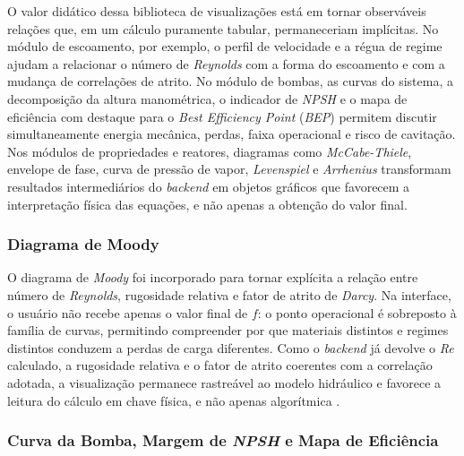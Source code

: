 O valor didático dessa biblioteca de visualizações está em tornar observáveis relações que, em um cálculo puramente tabular, permaneceriam implícitas. No módulo de escoamento, por exemplo, o perfil de velocidade e a régua de regime ajudam a relacionar o número de \textit{Reynolds} com a forma do escoamento e com a mudança de correlações de atrito. No módulo de bombas, as curvas do sistema, a decomposição da altura manométrica, o indicador de \textit{NPSH} e o mapa de eficiência com destaque para o \textit{Best Efficiency Point} (\textit{BEP}) permitem discutir simultaneamente energia mecânica, perdas, faixa operacional e risco de cavitação. Nos módulos de propriedades e reatores, diagramas como \textit{McCabe-Thiele}, envelope de fase, curva de pressão de vapor, \textit{Levenspiel} e \textit{Arrhenius} transformam resultados intermediários do \textit{backend} em objetos gráficos que favorecem a interpretação física das equações, e não apenas a obtenção do valor final.

\subsubsection{Diagrama de Moody}

O diagrama de \textit{Moody} foi incorporado para tornar explícita a relação entre número de \textit{Reynolds}, rugosidade relativa e fator de atrito de \textit{Darcy}. Na interface, o usuário não recebe apenas o valor final de $f$: o ponto operacional é sobreposto à família de curvas, permitindo compreender por que materiais distintos e regimes distintos conduzem a perdas de carga diferentes. Como o \textit{backend} já devolve o \textit{Re} calculado, a rugosidade relativa e o fator de atrito coerentes com a correlação adotada, a visualização permanece rastreável ao modelo hidráulico e favorece a leitura do cálculo em chave física, e não apenas algorítmica \cite{white2018,colebrook1939,swamee1976,haaland1983}.

\subsubsection{Curva da Bomba, Margem de \textit{NPSH} e Mapa de Eficiência}

